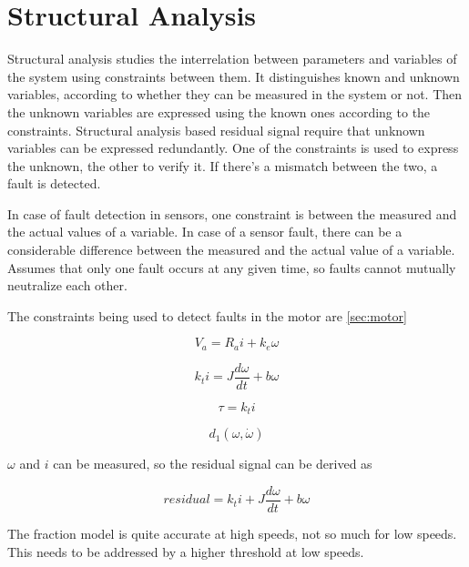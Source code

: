 \section{Structural Analysis}

\label{sec:structural}

Structural analysis studies the interrelation between parameters and variables of the system using constraints between them. It distinguishes known and unknown variables, according to whether they can be measured in the system or not. Then the unknown variables are expressed using the known ones according to the constraints. Structural analysis based residual signal require that unknown variables can be expressed redundantly. One of the constraints is used to express the unknown, the other to verify it. If there's a mismatch between the two, a fault is detected.

In case of fault detection in sensors, one constraint is between the measured and the actual values of a variable. In case of a sensor fault, there can be a considerable difference between the measured and the actual value of a variable. Assumes that only one fault occurs at any given time, so faults cannot mutually neutralize each other. 

The constraints being used to detect faults in the motor are \ref{sec:motor} 


\begin{equation}
V_a = R_a i + k_e \omega
\end{equation}

\begin{equation}
 k_{t}i  =J\dfrac{d\omega}{dt} + b\omega
\end{equation}

\begin{equation}
\tau = k_t i
\end{equation}

\begin{equation}
d_1(\omega, \dot{\omega})
\end{equation}

$\omega$ and $i$ can be measured, so the residual signal can be derived as


\begin{equation}
residual = k_t i + J \frac{d\omega}{dt} + b \omega
\end{equation}

The fraction model is quite accurate at high speeds, not so much for low speeds. This needs to be addressed by a higher threshold at low speeds.

